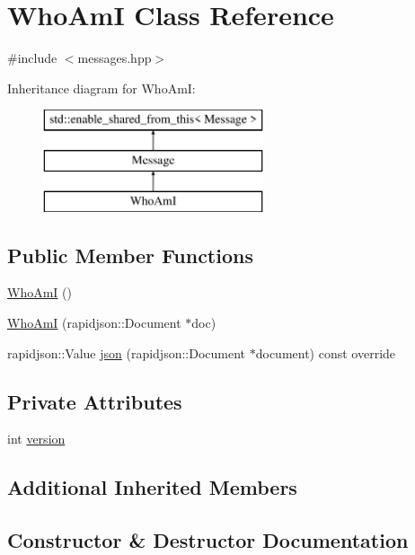 \hypertarget{classWhoAmI}{}\section{Who\+AmI Class Reference}
\label{classWhoAmI}


{\ttfamily \#include $<$messages.\+hpp$>$}

Inheritance diagram for Who\+AmI\+:\begin{figure}[H]
\begin{center}
\leavevmode
\includegraphics[height=3.000000cm]{classWhoAmI}
\end{center}
\end{figure}
\subsection*{Public Member Functions}
\begin{DoxyCompactItemize}
\item 
\mbox{\hyperlink{classWhoAmI_ae41a2e70254eb102102cd123d26b6c9f}{Who\+AmI}} ()
\item 
\mbox{\hyperlink{classWhoAmI_aa6d2d42633a1fd76e4aa76442f39c29a}{Who\+AmI}} (rapidjson\+::\+Document $\ast$doc)
\item 
rapidjson\+::\+Value \mbox{\hyperlink{classWhoAmI_a998c4b21d6235a84f15bd994b76be59d}{json}} (rapidjson\+::\+Document $\ast$document) const override
\end{DoxyCompactItemize}
\subsection*{Private Attributes}
\begin{DoxyCompactItemize}
\item 
int \mbox{\hyperlink{classWhoAmI_a5438cc57146d05f4f6b4fdfc155316fc}{version}}
\end{DoxyCompactItemize}
\subsection*{Additional Inherited Members}


\subsection{Constructor \& Destructor Documentation}
\mbox{\label{classWhoAmI_ae41a2e70254eb102102cd123d26b6c9f}} 
